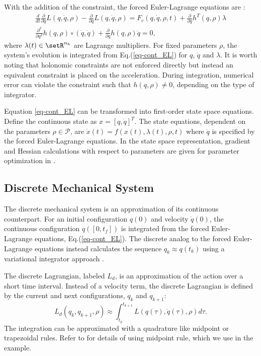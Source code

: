 \documentclass[letterpaper, 10pt, conference]{ieeeconf}
\begin{document}
With the addition of the constraint, the forced Euler-Lagrange equations are \cite{murray_li_sastry}:
\begin{equation}
\begin{array}{c}
\frac{d}{d t}\frac{\partial}{\partial \dot{q}}L(q,\dot{q},\rho) - \frac{\partial}{\partial q}L(q,\dot{q},\rho) = F_c(q,\dot{q},\rho,t) + \frac{\partial}{\partial q}h^T(q,\rho)\lambda\\
\frac{\partial^2}{\partial q^2}h(q,\rho)\circ(\dot{q},\dot{q}) + \frac{\partial}{\partial q}h(q,\rho)\ddot{q} = 0,
\end{array}
\label{eq-cont_EL}
\end{equation}
where $\lambda(t)\in\setR^{n_h}$ are Lagrange multipliers.  For fixed parameters $\rho$, the system's evolution is integrated from Eq.(\ref{eq-cont_EL}) for $q$, $\dot{q}$ and $\lambda$.  It is worth noting that holonomic constraints are not enforced directly but instead an equivalent constraint is placed on the acceleration.  During integration, numerical error can violate the constraint such that  $h(q,\rho)\neq 0$, depending on the type of integrator.

Equation \ref{eq-cont_EL} can be transformed into first-order state space equations.  Define the continuous state as $x = [q,\dot{q}]^T$.  The state equations, dependent on the parameters $\rho\in\mathcal{P}$, are $\dot{x}(t) = f(x(t),\lambda(t),\rho,t)$ where $\ddot{q}$ is specified by the forced Euler-Lagrange equations.  In the state space representation, gradient and Hessian calculations with respect to parameters are given for parameter optimization in \cite{miller_murphey}.

\subsection{Discrete Mechanical System}
The discrete mechanical system is an approximation of its continuous counterpart.  For an initial configuration $q(0)$ and velocity $\dot{q}(0)$, the continuous configuration $q([0,t_f])$ is integrated from the forced Euler-Lagrange equations, Eq.(\ref{eq-cont_EL}).  The discrete analog to the forced Euler-Lagrange equations instead calculates the sequence $q_k\approx q(t_k)$ using a variational integrator approach \cite{johnson_murphey_scalable}.  

The discrete Lagrangian, labeled $L_d$, is an approximation of the action over a short time interval.  Instead of a velocity term, the discrete Lagrangian is defined by the current and next configurations, $q_k$ and $q_{k+1}$:
\begin{equation}
L_d(q_k,q_{k+1},\rho) \approx \int_{t_k}^{t_{k+1}}L(q(\tau),\dot{q}(\tau),\rho)d\tau.
\label{eq-Ld}
\end{equation}
The integration can be approximated with a quadrature like midpoint or trapezoidal rules.  Refer to \cite{johnson_murphey_scalable} for details of using midpoint rule, which we use in the example.  
\end{document}
